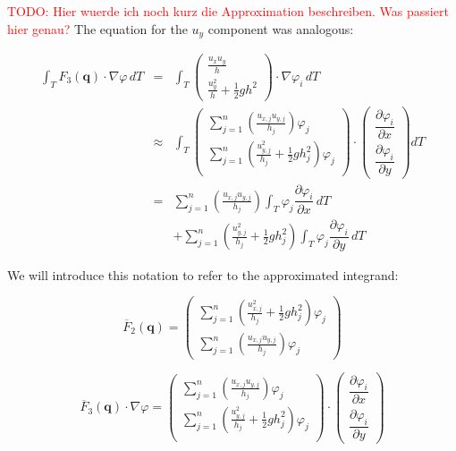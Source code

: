 \documentclass{article}
\newcommand{\todo}[2][]{\textcolor{red}{TODO\ifthenelse{\equal{#1}{}}{}{[#1]}: #2}}
\newcommand{\pd}[2]{\dfrac{\partial #1}{\partial #2}}
\renewcommand{\phi}{\varphi}
\begin{document}
\todo{Hier wuerde ich noch kurz die Approximation beschreiben. Was passiert hier genau?}
The equation for the $u_y$ component was analogous:

\begin{eqnarray*}
  \int_T F_3\left(\mathbf{q}\right) \cdot \nabla \phi \, dT & = &
  \int_T
  \begin{pmatrix}
    \frac{u_x u_y}{h} \\ \frac{u_y^2}{h} + \frac{1}{2} g h^2
  \end{pmatrix}
  \cdot \nabla \phi_i \, dT \\
  & \approx & \int_T
  \begin{pmatrix}
    \sum_{j=1}^n \left(\frac{u_{x,j} u_{y,j}}{h_j}\right) \phi_j \\
    \sum_{j=1}^n \left(\frac{u_{y,j}^2}{h_j} + \frac{1}{2} g h_j^2\right) \phi_j \\
  \end{pmatrix}
  \cdot
  \begin{pmatrix}
    \pd{\phi_i}{x} \\
    \pd{\phi_i}{y}
  \end{pmatrix} dT \\
  & = & \sum_{j=1}^n \left(\frac{u_{x,j} u_{y,j}}{h_j}\right) \int_T \phi_j \pd{\phi_i}{x} \, dT \\
  & {} & + \sum_{j=1}^n \left(\frac{u_{y,j}^2}{h_j} + \frac{1}{2} g h_j^2\right) \int_T \phi_j \pd{\phi_i}{y} \, dT
\end{eqnarray*}

We will introduce this notation to refer to the approximated integrand:

\begin{equation}
  \label{eq:point-wise-approx-result-second-line}
  \overline{F}_2(\mathbf{q}) %
  =
  \begin{pmatrix}
    \sum_{j=1}^n \left(\frac{u_{x,j}^2}{h_j} + \frac{1}{2} g h_j^2\right) \phi_j \\
    \sum_{j=1}^n \left(\frac{u_{x,j} u_{y,j}}{h_j}\right) \phi_j 
  \end{pmatrix}
\end{equation}

\begin{equation}
  \label{eq:point-wise-approx-result-third-line}
  \overline{F}_3(\mathbf{q}) \cdot \nabla \phi =
  \begin{pmatrix}
    \sum_{j=1}^n \left(\frac{u_{x,j} u_{y,j}}{h_j}\right) \phi_j \\
    \sum_{j=1}^n \left(\frac{u_{y,j}^2}{h_j} + \frac{1}{2} g h_j^2\right) \phi_j \\
  \end{pmatrix}
  \cdot
  \begin{pmatrix}
    \pd{\phi_i}{x} \\
    \pd{\phi_i}{y}
  \end{pmatrix}
\end{equation}
\end{document}
